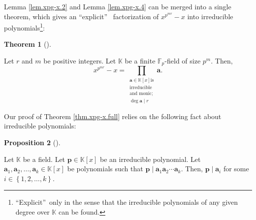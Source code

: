 \documentclass[numbers=enddot,12pt,final,onecolumn,notitlepage]{scrartcl}%
\theoremstyle{definition}
\newtheorem{theo}{Theorem}[subsection]
\newenvironment{theorem}[1][]
{\begin{theo}[#1]\begin{leftbar}}
{\end{leftbar}\end{theo}}
\newtheorem{prop}[theo]{Proposition}
\newenvironment{proposition}[1][]
{\begin{prop}[#1]\begin{leftbar}}
{\end{leftbar}\end{prop}}
\let\prodnonlimits\prod
\renewcommand{\prod}{\prodnonlimits\limits}
\begin{document}
Lemma \ref{lem.xpg-x.2} and Lemma \ref{lem.xpg-x.4} can be merged into a
single theorem, which gives an \textquotedblleft explicit\textquotedblright%
\ factorization of $x^{p^{mr}}-x$ into irreducible
polynomials\footnote{\textquotedblleft Explicit\textquotedblright\ only in the
sense that the irreducible polynomials of any given degree over $\mathbb{K}$
can be found.}:

\begin{theorem}
\label{thm.xpg-x.full}Let $r$ and $m$ be positive integers. Let $\mathbb{K}$
be a finite $\mathbb{F}_{p}$-field of size $p^{m}$. Then,%
\[
x^{p^{mr}}-x=\prod_{\substack{\mathbf{a}\in\mathbb{K}\left[  x\right]  \text{
is}\\\text{irreducible}\\\text{and monic;}\\\deg\mathbf{a}\mid r}}\mathbf{a}.
\]

\end{theorem}

Our proof of Theorem \ref{thm.xpg-x.full} relies on the following fact about
irreducible polynomials:

\begin{proposition}
\label{prop.irredpol.pabk}Let $\mathbb{K}$ be a field. Let $\mathbf{p}%
\in\mathbb{K}\left[  x\right]  $ be an irreducible polynomial. Let
$\mathbf{a}_{1},\mathbf{a}_{2},\ldots,\mathbf{a}_{k}\in\mathbb{K}\left[
x\right]  $ be polynomials such that $\mathbf{p}\mid\mathbf{a}_{1}%
\mathbf{a}_{2}\mathbf{\cdots a}_{k}$. Then, $\mathbf{p}\mid\mathbf{a}_{i}$ for
some $i\in\left\{  1,2,\ldots,k\right\}  $.
\end{proposition}
\end{document}
